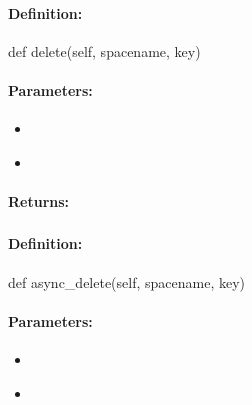 \paragraph{Definition:}
\begin{pythoncode}
def delete(self, spacename, key)
\end{pythoncode}

\paragraph{Parameters:}
\begin{itemize}[noitemsep]
\item {}\\

\item {}\\

\end{itemize}

\paragraph{Returns:}


\pagebreak
\subsubsection{}
\label{api:python:async_del}


\paragraph{Definition:}
\begin{pythoncode}
def async_delete(self, spacename, key)
\end{pythoncode}

\paragraph{Parameters:}
\begin{itemize}[noitemsep]
\item {}\\

\item {}\\

\end{itemize}


